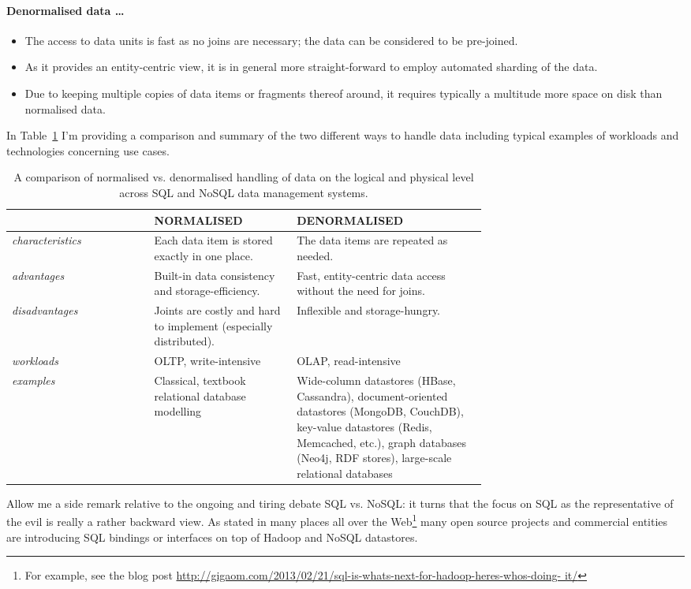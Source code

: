 \documentclass{llncs}
\begin{document}
\paragraph{Denormalised data \ldots} 
\begin{itemize}
	\item The access to data units is fast as no joins are necessary; the
data can be considered to be pre-joined.
	\item As it provides an entity-centric view, it is in general more 
straight-forward to employ automated sharding of the data.
	\item Due to keeping multiple copies of data items or fragments thereof
around, it requires typically a multitude more space on disk than normalised 
data.
\end{itemize}
In Table~\ref{tab:ndcomparison} I'm providing a comparison and summary of the
two different ways to handle data including typical examples of workloads and
technologies concerning use cases.
\begin{center}
\begin{table}
\caption{A comparison of normalised vs. denormalised handling of data on the 
logical and physical level across SQL and NoSQL data management systems.}
\label{tab:ndcomparison}
\begin{tabular}{l @{\hskip 2mm} p{0.30\linewidth} @{\hskip 5mm}
	            p{0.40\linewidth} @{\hskip 2mm}}
& \textbf{NORMALISED}& \textbf{DENORMALISED}\\
\hline
\hline
\emph{characteristics}&
Each data item is stored exactly in one place.&
The data items are repeated as needed.\\
\hline
\emph{advantages}&
Built-in data consistency and storage-efficiency.&
Fast, entity-centric data access without the need for joins.\\
\hline
\emph{disadvantages} &
Joints are costly and hard to implement (especially distributed).&
Inflexible and storage-hungry.\\
\hline
\emph{workloads} &
OLTP, write-intensive&
OLAP, read-intensive\\
\hline
\emph{examples} &
Classical, textbook relational database modelling&
Wide-column datastores (HBase, Cassandra), document-oriented 
datastores (MongoDB, CouchDB), key-value datastores (Redis, Memcached, etc.),
graph databases (Neo4j, RDF stores), large-scale relational databases\\
\hline
\hline
\end{tabular}
\centering
\end{table}
\end{center}
Allow me a side remark relative to the ongoing and tiring debate SQL vs. NoSQL: 
it turns that the focus on SQL as the representative of the evil is really a
rather backward view. As stated in many places all over the
Web\footnote{For example, see the blog post 
\url{http://gigaom.com/2013/02/21/sql-is-whats-next-for-hadoop-heres-whos-doing-
it/}} many open source projects and commercial entities are introducing SQL
bindings or interfaces on top of Hadoop and NoSQL datastores. 
\end{document}
